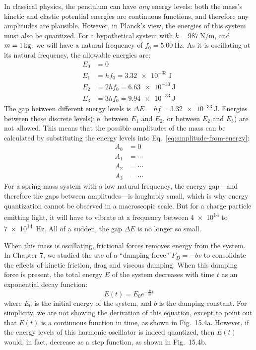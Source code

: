 In classical physics, the pendulum can have \emph{any} energy levels: both the
mass's kinetic and elastic potential energies are continuous functions, and
therefore any amplitudes are plausible. However, in Planck's view, the energies
of this system must also be quantized. For a hypothetical system with
$k=\SI{987}{\newton\per\metre}$, and $m=\SI1{\kilo\gram}$, we will have a
natural frequency of $f_0=\SI{5.00}\hertz$. As it is oscillating at its natural
frequency, the allowable energies are:
\begin{align*}
  E_0 &= 0\\
  E_1 &= hf_0  = \SI{3.32e-33}\joule\\
  E_2 &= 2hf_0 = \SI{6.63e-33}\joule\\
  E_3 &= 3hf_0 = \SI{9.94e-33}\joule
\end{align*}
The gap between different energy levels is $\Delta E=hf=\SI{3.32e-33}\joule$.
Energies between these discrete levels(i.e. between $E_1$ and $E_2$, or between
$E_2$ and $E_3$) are not allowed. This means that the possible amplitudes of
the mass can be calculated by substituting the energy levels into
Eq.~\ref{eq:amplitude-from-energy}:
\begin{align*}
  A_0 &= 0\\
  A_1 &= \cdots\\
  A_2 &= \cdots\\
  A_3 &= \cdots
\end{align*}
For a spring-mass system with a low natural frequency, the energy gap---and
therefore the gaps between amplitudes---is laughably small, which is why energy
quantization cannot be observed in a macroscopic scale. But for a charge
particle emitting light, it will have to vibrate at a frequency between
\num{4e14} to \SI{7e14}{\hertz}. All of a sudden, the gap $\Delta E$ is no longer so
small.

When this mass is oscillating, frictional forces removes energy from the
system. In Chapter 7, we studied the use of a ``damping force''
$F_D=-bv$ to consolidate the effects of kinetic friction, drag and viscous
damping. When this damping force is present, the total energy $E$ of the
system decreases with time $t$ as an exponential decay function:
\begin{equation}
  E(t)=E_0e^{-\frac bmt} %
\end{equation}
where $E_0$ is the initial energy of the system, and $b$ is the damping
constant. For simplicity, we are not showing the derivation of this equation,
except to point out that $E(t)$ is a continuous function in time, as shown in
Fig.\ 15.4a. However, if the energy levels of this harmonic oscillator is
indeed quantized, then $E(t)$ would, in fact, decrease as a step function, as
shown in Fig.\ 15.4b.


